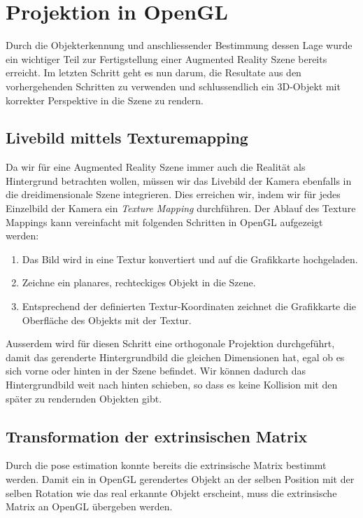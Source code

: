 
\chapter{Projektion in OpenGL}

Durch die Objekterkennung und anschliessender Bestimmung dessen Lage wurde ein wichtiger Teil zur Fertigstellung einer Augmented Reality Szene bereits erreicht. Im letzten Schritt geht es nun darum, die Resultate aus den vorhergehenden Schritten zu verwenden und schlussendlich ein 3D-Objekt mit korrekter Perspektive in die Szene zu rendern.


\section{Livebild mittels Texturemapping}

Da wir für eine Augmented Reality Szene immer auch die Realität als Hintergrund betrachten wollen, müssen wir das Livebild der Kamera ebenfalls in die dreidimensionale Szene integrieren. Dies erreichen wir, indem wir für jedes Einzelbild der Kamera ein \textit{Texture Mapping} durchführen.
Der Ablauf des Texture Mappings kann vereinfacht mit folgenden Schritten in OpenGL aufgezeigt werden:

\begin{enumerate}
\item Das Bild wird in eine Textur konvertiert und auf die Grafikkarte hochgeladen.
\item Zeichne ein planares, rechteckiges Objekt in die Szene.
\item Entsprechend der definierten Textur-Koordinaten zeichnet die Grafikkarte die Oberfläche des Objekts mit der Textur.
\end{enumerate}
\noindent
Ausserdem wird für diesen Schritt eine orthogonale Projektion durchgeführt, damit das gerenderte Hintergrundbild die gleichen Dimensionen hat, egal ob es sich vorne oder hinten in der Szene befindet. Wir können dadurch das Hintergrundbild weit nach hinten schieben, so dass es keine Kollision mit den später zu rendernden Objekten gibt.


\section{Transformation der extrinsischen Matrix}

Durch die pose estimation konnte bereits die extrinsische Matrix bestimmt werden. Damit ein in OpenGL gerendertes Objekt an der selben Position mit der selben Rotation wie das real erkannte Objekt erscheint, muss die extrinsische Matrix an OpenGL übergeben werden.



